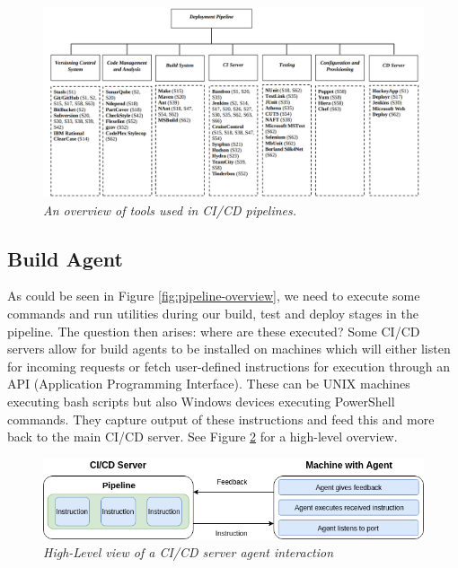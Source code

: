 \begin{figure}[ht]
    \centering
    \includegraphics[width=\textwidth]{figures/deployment_pipeline.png}
    \caption{\textit{An overview of tools used in CI/CD pipelines.}\cite{cicd-review}}
    \label{fig:deployment-pipeline}
\end{figure}

\subsection{Build Agent}
As could be seen in Figure \ref{fig:pipeline-overview}, we need to execute some commands and run utilities during our build, test and deploy stages in the pipeline. The question then arises: where are these executed? Some CI/CD servers allow for build agents to be installed on machines which will either listen for incoming requests or fetch user-defined instructions for execution through an API (Application Programming Interface). These can be UNIX machines executing bash scripts but also Windows devices executing PowerShell commands.\cite{gitlab-shell} They capture output of these instructions and feed this and more back to the main CI/CD server. See Figure \ref{fig:cicdserver-agent} for a high-level overview.

\begin{figure}[ht]
    \centering
    \includegraphics[width=\textwidth]{figures/drawio/cicdserver-agent.png}
    \caption{\textit{High-Level view of a CI/CD server agent interaction}}
    \label{fig:cicdserver-agent}
\end{figure}

